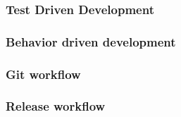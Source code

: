 \begin{frame}
\frametitle{Test Driven Development}

\end{frame}

\begin{frame}
\frametitle{Behavior driven development}

\end{frame}

\begin{frame}
\frametitle{Git workflow}

\end{frame}

\begin{frame}
\frametitle{Release workflow}

\end{frame}
